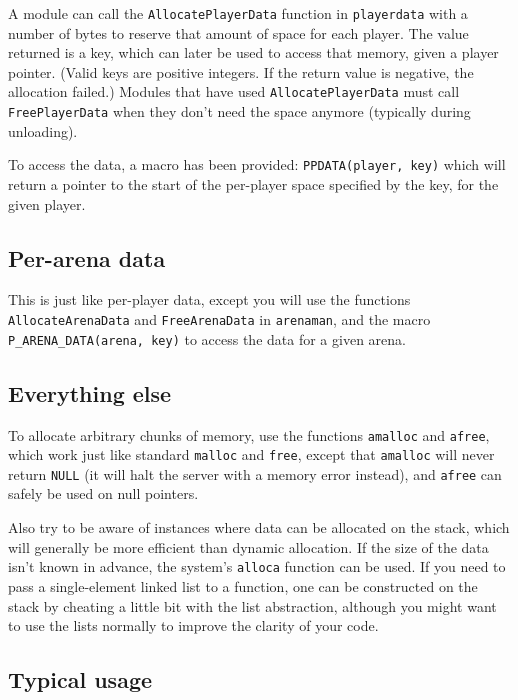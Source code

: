 \documentclass{article}
\begin{document}
A module can call the \verb/AllocatePlayerData/ function in
\verb/playerdata/ with a number of bytes to reserve that amount of space
for each player. The value returned is a key, which can later be used to
access that memory, given a player pointer. (Valid keys are positive
integers. If the return value is negative, the allocation failed.)
Modules that have used \verb/AllocatePlayerData/ must call
\verb/FreePlayerData/ when they don't need the space anymore (typically
during unloading).

To access the data, a macro has been provided: \verb/PPDATA(player, key)/
which will return a pointer to the start of the per-player space
specified by the key, for the given player.


\subsection{Per-arena data}

This is just like per-player data, except you will use the functions
\verb/AllocateArenaData/ and \verb/FreeArenaData/ in \verb/arenaman/,
and the macro \verb/P_ARENA_DATA(arena, key)/ to access the data for a
given arena.


\subsection{Everything else}

To allocate arbitrary chunks of memory, use the functions \verb/amalloc/
and \verb/afree/, which work just like standard \verb/malloc/ and
\verb/free/, except that \verb/amalloc/ will never return \verb/NULL/
(it will halt the server with a memory error instead), and \verb/afree/
can safely be used on null pointers.

Also try to be aware of instances where data can be allocated on the
stack, which will generally be more efficient than dynamic allocation.
If the size of the data isn't known in advance, the system's
\verb/alloca/ function can be used. If you need to pass a single-element
linked list to a function, one can be constructed on the stack by
cheating a little bit with the list abstraction, although you might want
to use the lists normally to improve the clarity of your code.


\subsection{Typical usage}
\end{document}
